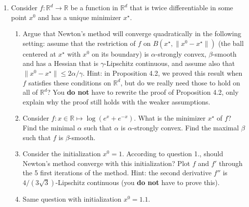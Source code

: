 \documentclass[12pt]{article}
\newcommand{\dotp}[1]{\langle #1 \rangle}
\newcommand{\dom}{\mathrm{dom}}
\newcommand{\R}{\mathbb{R}}
\begin{document}
\begin{enumerate}


\item Consider $f:\R^d\to \R$ be a function in $\R^d$ that is twice differentiable in some point $x^0$ and has a unique minimizer $x^\star$.  %
\begin{enumerate}
\item Argue that Newton's method will converge quadratically in the following setting: assume that the restriction of $f$ on $B(x^\star,\|x^0-x^\star\|)$ (the ball centered at $x^\star$ with $x^0$ on its boundary) is $\alpha$-strongly convex, $\beta$-smooth and has a Hessian that is $\gamma$-Lipschitz continuous, and assume also that $\|x^0-x^\star\|\leq 2\alpha/\gamma$. Hint: in Proposition 4.2, we proved this result when $f$ satisfies these conditions on $\R^d$, but do we really need those to hold on all of $\R^d$? You \textbf{do not} have to rewrite the proof of Proposition 4.2, only explain why the proof still holds with the weaker assumptions.
\item Consider $f:x\in\R \mapsto \log(e^x+e^{-x})$. What is the minimizer $x^\star$ of $f$? Find the minimal $\alpha$ such that $\alpha$ is $\alpha$-strongly convex. Find the maximal $\beta$ such that $f$ is $\beta$-smooth. 
\item Consider the initialization $x^0=1$. According to question 1., should Newton's method converge with this initialization? Plot $f$ and $f'$ through the 5 first iterations of the method. Hint: the second derivative $f''$ is $4/(3\sqrt{3})$-Lipschitz continuous (you \textbf{do not} have to prove this).
\item Same question with initialization $x^0=1.1$.
\end{enumerate}



\end{enumerate}
\end{document}
